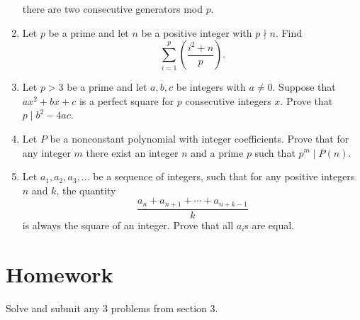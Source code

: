 \documentclass{article}
\begin{document}
\begin{enumerate}
    there are two consecutive generators mod $p$.
  \item Let $p$ be a prime and let $n$ be a positive integer with $p\nmid n$.
    Find \[\sum_{i=1}^p\left(\frac{i^2+n}p\right).\]
  \item Let $p>3$ be a prime and let $a,b,c$ be integers with $a\ne 0$. Suppose
    that $ax^2+bx+c$ is a perfect square for $p$ consecutive integers $x$. Prove
    that $p\mid b^2-4ac$.
  \item Let $P$ be a nonconstant polynomial with integer coefficients. Prove that for any
    integer $m$ there exist an integer $n$ and a prime $p$ such that $p^m\mid
    P(n)$.
  \item Let $a_1,a_2,a_3,\ldots$ be a sequence of integers, such that for any
    positive integers $n$ and $k$, the quantity
    \[\frac{a_n+a_{n+1}+\cdots+a_{n+k-1}}k\]
    is always the square of an integer. Prove that all $a_i$s are equal.
\end{enumerate}
\section{Homework}
Solve and submit any 3 problems from section 3.
\end{document}
